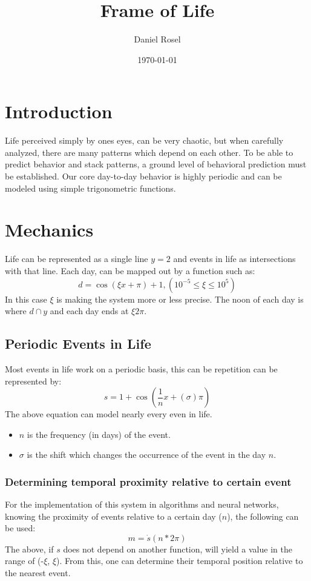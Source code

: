 \documentclass[11pt]{article}
\author{Daniel Rosel}
\date{\today}
\title{Frame of Life}
\begin{document}
\maketitle
\tableofcontents


\section{Introduction}
\label{sec:org750505b}
Life perceived simply by ones eyes, can be very chaotic, but when carefully analyzed, there are many patterns which depend on each other. To be able to predict behavior and stack patterns, a ground level of behavioral prediction must be established. Our core day-to-day behavior is highly periodic and can be modeled using simple trigonometric functions.
\section{Mechanics}
\label{sec:orgf7bf620}
Life can be represented as a single line \(y = 2\) and events in life as intersections with that line. Each day, can be mapped out by a function such as:
\begin{equation}
    d = \cos{(\xi x + \pi) + 1}, (10^{-5} \leq \xi \leq 10^{5})
\end{equation}
In this case \(\xi\) is making the system more or less precise. The noon of each day is where \(d \cap y\) and each day ends at \(\xi2\pi\).
\subsection{Periodic Events in Life}
\label{sec:org1825b26}
Most events in life work on a periodic basis, this can be repetition can be represented by:
\begin{equation}
s = 1 + \cos{(\frac{1}{n}x + (\sigma)\pi)}
\end{equation}
The above equation can model nearly every even in life.
\begin{itemize}
\item \(n\) is the frequency (in days) of the event.
\item \(\sigma\) is the shift which changes the occurrence of the event in the day \(n\).
\end{itemize}
\subsubsection{Determining temporal proximity relative to certain event}
\label{sec:org9b62f7f}
For the implementation of this system in algorithms and neural networks, knowing the proximity of events relative to a certain day (\(n\)), the following can be used:
\begin{equation}
    m = \dot{s}(n * 2\pi)
\end{equation}
The above, if \(s\) does not depend on another function, will yield a value in the range of (-\(\xi\), \(\xi\)). From this, one can determine their temporal position relative to the nearest event.
\end{document}
